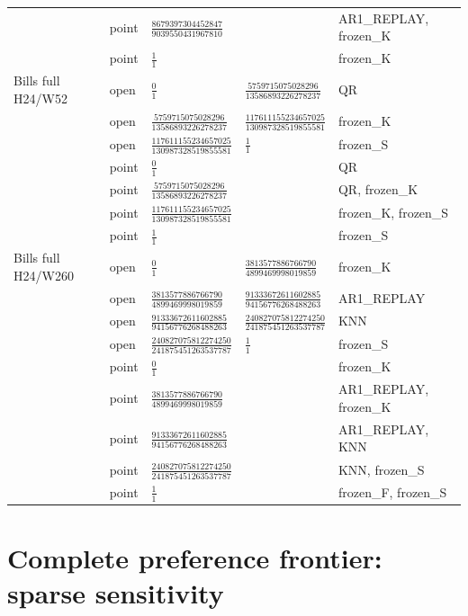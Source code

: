 \documentclass[11pt,a4paper]{article}
\begin{document}
\begin{longtable}{p{28mm}p{10mm}p{39mm}p{39mm}p{28mm}}
 & point & \(\frac{8679397304452847}{9039550431967810}\) &  & AR1\_REPLAY, frozen\_K \\
 & point & \(\frac{1}{1}\) &  & frozen\_K \\
Bills full H24/W52 & open & \(\frac{0}{1}\) & \(\frac{5759715075028296}{13586893226278237}\) & QR \\
 & open & \(\frac{5759715075028296}{13586893226278237}\) & \(\frac{117611155234657025}{130987328519855581}\) & frozen\_K \\
 & open & \(\frac{117611155234657025}{130987328519855581}\) & \(\frac{1}{1}\) & frozen\_S \\
 & point & \(\frac{0}{1}\) &  & QR \\
 & point & \(\frac{5759715075028296}{13586893226278237}\) &  & QR, frozen\_K \\
 & point & \(\frac{117611155234657025}{130987328519855581}\) &  & frozen\_K, frozen\_S \\
 & point & \(\frac{1}{1}\) &  & frozen\_S \\
Bills full H24/W260 & open & \(\frac{0}{1}\) & \(\frac{3813577886766790}{4899469998019859}\) & frozen\_K \\
 & open & \(\frac{3813577886766790}{4899469998019859}\) & \(\frac{91333672611602885}{94156776268488263}\) & AR1\_REPLAY \\
 & open & \(\frac{91333672611602885}{94156776268488263}\) & \(\frac{240827075812274250}{241875451263537787}\) & KNN \\
 & open & \(\frac{240827075812274250}{241875451263537787}\) & \(\frac{1}{1}\) & frozen\_S \\
 & point & \(\frac{0}{1}\) &  & frozen\_K \\
 & point & \(\frac{3813577886766790}{4899469998019859}\) &  & AR1\_REPLAY, frozen\_K \\
 & point & \(\frac{91333672611602885}{94156776268488263}\) &  & AR1\_REPLAY, KNN \\
 & point & \(\frac{240827075812274250}{241875451263537787}\) &  & KNN, frozen\_S \\
 & point & \(\frac{1}{1}\) &  & frozen\_F, frozen\_S \\
\end{longtable}
\endgroup

\section{Complete preference frontier: sparse sensitivity}\label{sup:frontier-8}
\end{document}
